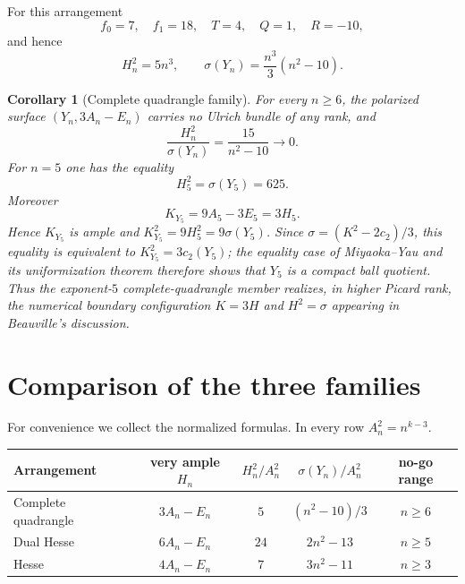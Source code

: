 \documentclass[11pt]{article}
\newtheorem{corollary}[theorem]{Corollary}
\newcommand{\sig}{\sigma}
\begin{document}
For this arrangement
\[
 f_0=7,\quad f_1=18,\quad T=4,
 \quad Q=1,\quad R=-10,
\]
and hence
\begin{equation}\label{eq:quadr-family}
 H_n^2=5n^3,
 \qquad
 \sig(Y_n)=\frac{n^3}{3}(n^2-10).
\end{equation}

\begin{corollary}[Complete quadrangle family]\label{cor:quadr-family}
For every $n\ge6$, the polarized surface $(Y_n,3A_n-E_n)$ carries no Ulrich
bundle of any rank, and
\[
        \frac{H_n^2}{\sig(Y_n)}=\frac{15}{n^2-10}\longrightarrow0.
\]
For $n=5$ one has the equality
\[
        H_5^2=\sig(Y_5)=625.
\]
Moreover
\[
        K_{Y_5}=9A_5-3E_5=3H_5.
\]
Hence $K_{Y_5}$ is ample and $K_{Y_5}^2=9H_5^2=9\sig(Y_5)$.  Since
$\sig=(K^2-2c_2)/3$, this equality is equivalent to $K_{Y_5}^2=3c_2(Y_5)$;
the equality case of Miyaoka--Yau and its uniformization theorem
\cite{Miyaoka1977,Yau1977,GrebKebekusPeternellTaji} therefore
shows that $Y_5$ is a compact ball quotient.
Thus the exponent-$5$ complete-quadrangle member realizes, in higher Picard
rank, the numerical boundary configuration $K=3H$ and $H^2=\sig$ appearing in
Beauville's discussion.
\end{corollary}

\section{Comparison of the three families}

For convenience we collect the normalized formulas.  In every row $A_n^2=n^{k-3}$.

\begin{center}
\begin{tabular}{>{\raggedright\arraybackslash}p{4.1cm}cccc}
\toprule
Arrangement & very ample $H_n$ & $H_n^2/A_n^2$ & $\sig(Y_n)/A_n^2$ & no-go range\\
\midrule
Complete quadrangle & $3A_n-E_n$ & $5$ & $(n^2-10)/3$ & $n\ge6$\\
Dual Hesse & $6A_n-E_n$ & $24$ & $2n^2-13$ & $n\ge5$\\
Hesse & $4A_n-E_n$ & $7$ & $3n^2-11$ & $n\ge3$\\
\bottomrule
\end{tabular}
\end{center}
\end{document}
